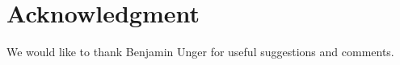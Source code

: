 \documentclass[final,reqno]{siamltex}
\begin{document}
\section*{Acknowledgment} We would like to thank Benjamin Unger for useful
suggestions and comments.



%
\end{document}
